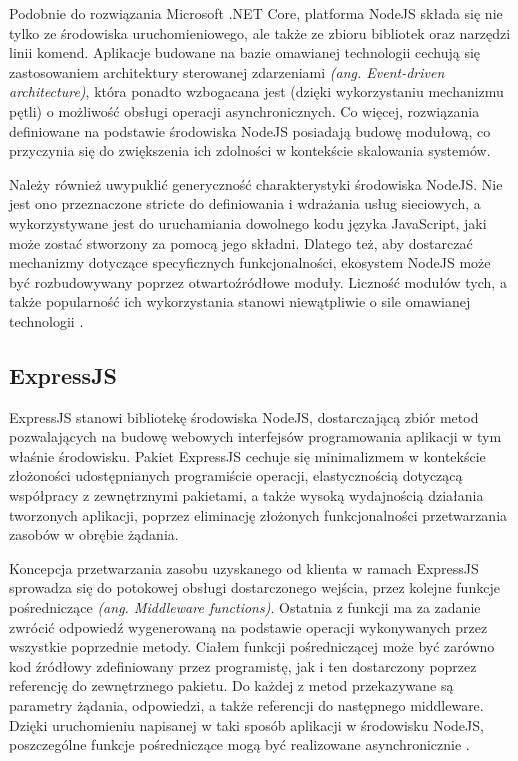 Podobnie do rozwiązania Microsoft .NET Core, platforma NodeJS składa się nie tylko ze środowiska uruchomieniowego, ale także ze zbioru bibliotek oraz narzędzi linii komend. Aplikacje budowane na bazie omawianej technologii cechują się zastosowaniem architektury sterowanej zdarzeniami \textit{(ang. Event-driven architecture)}, która ponadto wzbogacana jest (dzięki wykorzystaniu mechanizmu pętli) o możliwość obsługi operacji asynchronicznych. Co więcej, rozwiązania definiowane na podstawie środowiska NodeJS posiadają budowę modułową, co przyczynia się do zwiększenia ich zdolności w kontekście skalowania systemów.

Należy również uwypuklić generyczność charakterystyki środowiska NodeJS. Nie jest ono przeznaczone stricte do definiowania i wdrażania usług sieciowych, a wykorzystywane jest do uruchamiania dowolnego kodu języka JavaScript, jaki może zostać stworzony za pomocą jego składni. Dlatego też, aby dostarczać mechanizmy dotyczące specyficznych funkcjonalności, ekosystem NodeJS może być rozbudowywany poprzez otwartoźródłowe moduły. Liczność modułów tych, a także popularność ich wykorzystania stanowi niewątpliwie o sile omawianej technologii \cite{casciaro2020node}.
\subsection*{ExpressJS}
ExpressJS stanowi bibliotekę środowiska NodeJS, dostarczającą zbiór metod pozwalających na budowę webowych interfejsów programowania aplikacji w tym właśnie środowisku. Pakiet ExpressJS cechuje się minimalizmem w kontekście złożoności udostępnianych programiście operacji, elastycznością dotyczącą współpracy z zewnętrznymi pakietami, a także wysoką wydajnością działania tworzonych aplikacji, poprzez eliminację złożonych funkcjonalności przetwarzania zasobów w obrębie żądania.

Koncepcja przetwarzania zasobu uzyskanego od klienta w ramach ExpressJS sprowadza się do potokowej obsługi dostarczonego wejścia, przez kolejne funkcje pośredniczące \textit{(ang. Middleware functions)}. Ostatnia z funkcji ma za zadanie zwrócić odpowiedź wygenerowaną na podstawie operacji wykonywanych przez wszystkie poprzednie metody. Ciałem funkcji pośredniczącej może być zarówno kod źródłowy zdefiniowany przez programistę, jak i ten dostarczony poprzez referencję do zewnętrznego pakietu. Do każdej z metod przekazywane są parametry żądania, odpowiedzi, a także referencji do następnego middleware. Dzięki uruchomieniu napisanej w taki sposób aplikacji w środowisku NodeJS, poszczególne funkcje pośredniczące mogą być realizowane asynchronicznie \cite{mardan2014express}.
